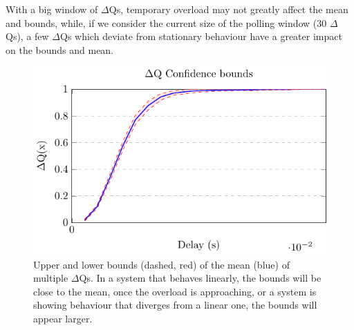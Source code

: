     With a big window of $\Delta$Qs, temporary overload may not greatly affect the mean and bounds, while, if we consider the current size of the polling window (30 $\Delta$Qs), a few $\Delta$Qs which deviate from stationary behaviour have a greater impact on the bounds and mean.
        \begin{figure}[H]
            \begin{center}
                \includegraphics[scale=1]{tikz/ci.pdf} 
            \end{center}
            \caption{Upper and lower bounds (dashed, red) of the mean (blue) of multiple $\Delta$Qs. In a system that behaves linearly, the bounds will be close to the mean, once the overload is approaching, or a system is showing behaviour that diverges from a linear one, the bounds will appear larger.}%
            \label{fig:bi}%
        \end{figure} 

